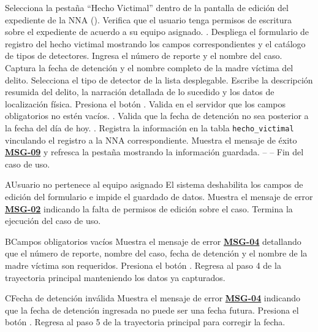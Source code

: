 \begin{UCtrayectoria}
	\UCpaso[\UCactor] Selecciona la pestaña ``Hecho Victimal'' dentro de la pantalla de edición del expediente de la NNA ().
	\UCpaso Verifica que el usuario tenga permisos de escritura sobre el expediente de acuerdo a su equipo asignado. .
	\UCpaso Despliega el formulario de registro del hecho victimal mostrando los campos correspondientes y el catálogo de tipos de detectores.
	\UCpaso[\UCactor] Ingresa el número de reporte y el nombre del caso.
	\UCpaso[\UCactor] Captura la fecha de detención y el nombre completo de la madre víctima del delito.
	\UCpaso[\UCactor] Selecciona el tipo de detector de la lista desplegable.
	\UCpaso[\UCactor] Escribe la descripción resumida del delito, la narración detallada de lo sucedido y los datos de localización física.
	\UCpaso[\UCactor] Presiona el botón .
	\UCpaso Valida en el servidor que los campos obligatorios no estén vacíos. .
	\UCpaso Valida que la fecha de detención no sea posterior a la fecha del día de hoy. .
	\UCpaso Registra la información en la tabla \texttt{hecho\_victimal} vinculando el registro a la NNA correspondiente.
	\UCpaso Muestra el mensaje de éxito \hyperlink{mMSG09}{\bf MSG-09} y refresca la pestaña mostrando la información guardada.
	\UCpaso[] -- -- Fin del caso de uso.
\end{UCtrayectoria}

\begin{UCtrayectoriaA}{A}{Usuario no pertenece al equipo asignado}
	\UCpaso El sistema deshabilita los campos de edición del formulario e impide el guardado de datos.
	\UCpaso Muestra el mensaje de error \hyperlink{mMSG02}{\bf MSG-02} indicando la falta de permisos de edición sobre el caso.
	\UCpaso Termina la ejecución del caso de uso.
\end{UCtrayectoriaA}

\begin{UCtrayectoriaA}{B}{Campos obligatorios vacíos}
	\UCpaso Muestra el mensaje de error \hyperlink{mMSG04}{\bf MSG-04} detallando que el número de reporte, nombre del caso, fecha de detención y el nombre de la madre víctima son requeridos.
	\UCpaso[\UCactor] Presiona el botón .
	\UCpaso Regresa al paso 4 de la trayectoria principal manteniendo los datos ya capturados.
\end{UCtrayectoriaA}

\begin{UCtrayectoriaA}{C}{Fecha de detención inválida}
	\UCpaso Muestra el mensaje de error \hyperlink{mMSG04}{\bf MSG-04} indicando que la fecha de detención ingresada no puede ser una fecha futura.
	\UCpaso[\UCactor] Presiona el botón .
	\UCpaso Regresa al paso 5 de la trayectoria principal para corregir la fecha.
\end{UCtrayectoriaA}
